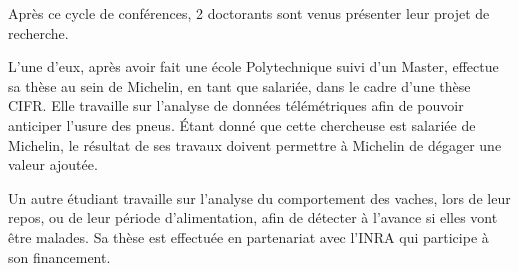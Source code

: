 \documentclass[12pt, a4paper]{report}
\begin{document}
Après ce cycle de conférences, 2 doctorants sont venus présenter leur projet de recherche.

L'une d'eux, après avoir fait une école Polytechnique suivi d'un Master, effectue sa thèse au sein de Michelin, en tant que salariée, dans le cadre d'une thèse CIFR. Elle travaille sur l'analyse de données télémétriques afin de pouvoir anticiper l'usure des pneus. Étant donné que cette chercheuse est salariée de Michelin, le résultat de ses travaux doivent permettre à Michelin de dégager une valeur ajoutée.

Un autre étudiant travaille sur l'analyse du comportement des vaches, lors de leur repos, ou de leur période d'alimentation, afin de détecter à l'avance si elles vont être malades. Sa thèse est effectuée en partenariat avec l'INRA qui participe à son financement.
\end{document}
